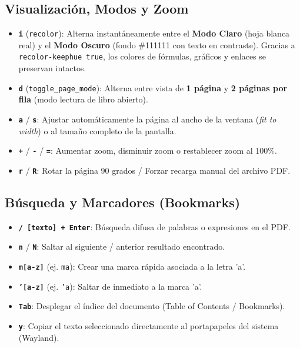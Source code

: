 \documentclass[11pt,article,spanish]{apuntes-scr}
\begin{document}
\subsection{Visualización, Modos y Zoom}
\begin{itemize}[leftmargin=*]
    \item \textbf{\texttt{i}} (\texttt{recolor}): Alterna instantáneamente entre el \textbf{Modo Claro} (hoja blanca real) y el \textbf{Modo Oscuro} (fondo \#111111 con texto en contraste). Gracias a \texttt{recolor-keephue true}, los colores de fórmulas, gráficos y enlaces se preservan intactos.
    \item \textbf{\texttt{d}} (\texttt{toggle\_page\_mode}): Alterna entre vista de \textbf{1 página} y \textbf{2 páginas por fila} (modo lectura de libro abierto).
    \item \textbf{\texttt{a}} / \textbf{\texttt{s}}: Ajustar automáticamente la página al ancho de la ventana (\textit{fit to width}) o al tamaño completo de la pantalla.
    \item \textbf{\texttt{+}} / \textbf{\texttt{-}} / \textbf{\texttt{=}}: Aumentar zoom, disminuir zoom o restablecer zoom al 100\%.
    \item \textbf{\texttt{r}} / \textbf{\texttt{R}}: Rotar la página 90 grados / Forzar recarga manual del archivo PDF.
\end{itemize}

\subsection{Búsqueda y Marcadores (Bookmarks)}
\begin{itemize}[leftmargin=*]
    \item \textbf{\texttt{/ [texto] + Enter}}: Búsqueda difusa de palabras o expresiones en el PDF.
    \item \textbf{\texttt{n}} / \textbf{\texttt{N}}: Saltar al siguiente / anterior resultado encontrado.
    \item \textbf{\texttt{m[a-z]}} (ej. \texttt{ma}): Crear una marca rápida asociada a la letra 'a'.
    \item \textbf{\texttt{'[a-z]}} (ej. \texttt{'a}): Saltar de inmediato a la marca 'a'.
    \item \textbf{\texttt{Tab}}: Desplegar el índice del documento (Table of Contents / Bookmarks).
    \item \textbf{\texttt{y}}: Copiar el texto seleccionado directamente al portapapeles del sistema (Wayland).
\end{itemize}
\end{document}
